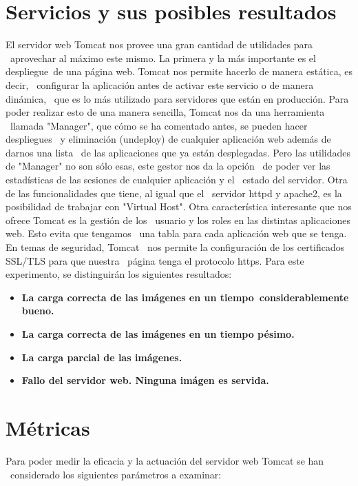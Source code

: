 \documentclass[11pt,twoside,a4paper]{book}
\begin{document}
\section{Servicios y sus posibles resultados}
El servidor web Tomcat nos provee una gran cantidad de utilidades para \
aprovechar al máximo este mismo. La primera y la más importante es el despliegue\
de una página web. Tomcat nos permite hacerlo de manera estática, es decir, \
configurar la aplicación antes de activar este servicio o de manera dinámica, \
que es lo más utilizado para servidores que están en producción.
\newline
Para poder realizar esto de una manera sencilla, Tomcat nos da una herramienta \
llamada "Manager", que cómo se ha comentado antes, se pueden hacer despliegues \
y eliminación (undeploy) de cualquier aplicación web además de darnos una lista \
de las aplicaciones que ya están desplegadas.
\newline
Pero las utilidades de "Manager" no son sólo esas, este gestor nos da la opción \
de poder ver las estadísticas de las sesiones de cualquier aplicación y el \
estado del servidor. Otra de las funcionalidades que tiene, al igual que el \
servidor httpd y apache2, es la posibilidad de trabajar con "Virtual Host".
\newline
Otra característica interesante que nos ofrece Tomcat es la gestión de los \
usuario y los roles en las distintas aplicaciones web. Esto evita que tengamos \
una tabla para cada aplicación web que se tenga. En temas de seguridad, Tomcat \
nos permite la configuración de los certificados SSL/TLS para que nuestra \
página tenga el protocolo https.
\newline
Para este experimento, se distinguirán los siguientes resultados:

\begin{itemize}
  \item \textbf{La carga correcta de las imágenes en un tiempo\
  considerablemente bueno.}
  \item \textbf{La carga correcta de las imágenes en un tiempo pésimo.}
  \item \textbf{La carga parcial de las imágenes.}
  \item \textbf{Fallo del servidor web. Ninguna imágen es servida.}
\end{itemize}


\section{Métricas}
Para poder medir la eficacia y la actuación del servidor web Tomcat se han \
considerado los siguientes parámetros a examinar:
\end{document}
